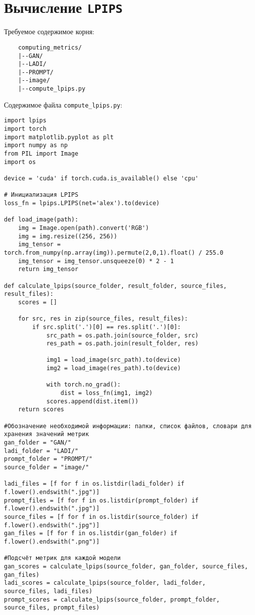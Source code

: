 \section{Вычисление \texttt{LPIPS}}\label{app:lpips}
Требуемое содержимое корня:
\begin{verbatim}
    computing_metrics/
    |--GAN/
    |--LADI/
    |--PROMPT/
    |--image/
    |--compute_lpips.py
\end{verbatim}
Содержимое файла \texttt{compute\_lpips.py}:
\begin{verbatim}
import lpips
import torch
import matplotlib.pyplot as plt
import numpy as np
from PIL import Image
import os

device = 'cuda' if torch.cuda.is_available() else 'cpu'

# Инициализация LPIPS
loss_fn = lpips.LPIPS(net='alex').to(device)

def load_image(path):
    img = Image.open(path).convert('RGB')
    img = img.resize((256, 256))  
    img_tensor = torch.from_numpy(np.array(img)).permute(2,0,1).float() / 255.0
    img_tensor = img_tensor.unsqueeze(0) * 2 - 1 
    return img_tensor

def calculate_lpips(source_folder, result_folder, source_files, result_files):
    scores = []
    
    for src, res in zip(source_files, result_files):
        if src.split('.')[0] == res.split('.')[0]:
            src_path = os.path.join(source_folder, src)
            res_path = os.path.join(result_folder, res)

            img1 = load_image(src_path).to(device)
            img2 = load_image(res_path).to(device)

            with torch.no_grad():
                dist = loss_fn(img1, img2)
            scores.append(dist.item())
    return scores

#Обозначение необходимой информации: папки, список файлов, словари для хранения значений метрик
gan_folder = "GAN/"
ladi_folder = "LADI/"
prompt_folder = "PROMPT/"
source_folder = "image/"

ladi_files = [f for f in os.listdir(ladi_folder) if f.lower().endswith(".jpg")]
prompt_files = [f for f in os.listdir(prompt_folder) if f.lower().endswith(".jpg")]
source_files = [f for f in os.listdir(source_folder) if f.lower().endswith(".jpg")]
gan_files = [f for f in os.listdir(gan_folder) if f.lower().endswith(".png")]

#Подсчёт метрик для каждой модели
gan_scores = calculate_lpips(source_folder, gan_folder, source_files, gan_files)
ladi_scores = calculate_lpips(source_folder, ladi_folder, source_files, ladi_files)
prompt_scores = calculate_lpips(source_folder, prompt_folder, source_files, prompt_files)


\end{verbatim}
